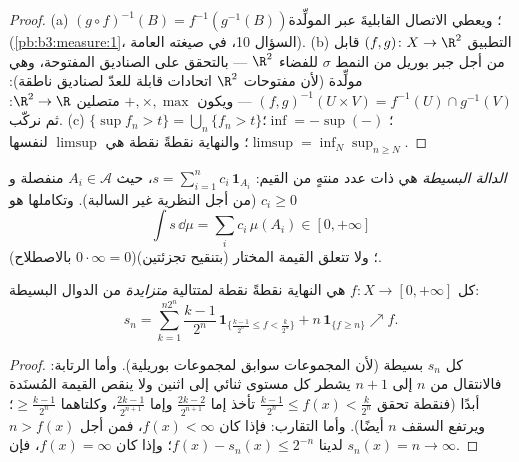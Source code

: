 \begin{proof}
(a) $(g\circ f)^{-1}(B) = f^{-1}(g^{-1}(B))$؛ ويعطي الاتصال القابليةَ  عبر  المولِّدة (\cref{pb:b3:measure:1}، السؤال 10، في صيغته العامة).
(b) التطبيق $(f, g) \colon X \to \R^2$ قابل  من أجل جبر بوريل من النمط
$\sigma$ للفضاء $\R^2$ --- بالتحقق على الصناديق المفتوحة، وهي
مولِّدة (لأن مفتوحات $\R^2$ اتحادات قابلة للعدّ لصناديق ناطقة):
$(f,g)^{-1}(U\times V) = f^{-1}(U)\cap g^{-1}(V)$ --- ويكون $+, \times, \max$ متصلين $\R^2 \to \R$: ثم نركّب.
(c) $\{\sup f_n > t\} = \bigcup_n\{f_n > t\}$؛ $\inf = -\sup(-)$؛ $\limsup = \inf_N\sup_{n \geq N}$؛ والنهاية نقطةً نقطة هي $\limsup$
لنفسها.
\end{proof}

\begin{definition}\label{def:b3:lebesgue:simple}
\emph{الدالة البسيطة} هي  ذات
عدد منتهٍ من القيم: $s = \sum_{i=1}^n
c_i\,\mathbf 1_{A_i}$، حيث $A_i \in \mathcal A$ منفصلة و $c_i \geq
0$ (من أجل
النظرية غير السالبة). وتكاملها هو
\[
\int s\,\dd\mu = \sum_i c_i\,\mu(A_i) \in [0, +\infty]
\]
(بالاصطلاح $0\cdot\infty = 0$)؛ ولا تتعلق القيمة  المختار (بتنقيح
تجزئتين).
\end{definition}

\begin{theorem}
\label{thm:b3:lebesgue:approximation}
كل  $f \colon X \to [0, +\infty]$ هي النهاية نقطةً نقطة لمتتالية
\emph{متزايدة} من الدوال البسيطة:
\[
s_n = \sum_{k=1}^{n2^n} \frac{k-1}{2^n}\,
\mathbf 1_{\{\frac{k-1}{2^n} \leq f < \frac k{2^n}\}}
+ n\,\mathbf 1_{\{f \geq n\}} \nearrow f .
\]
\end{theorem}

\begin{proof}
كل $s_n$ بسيطة (لأن المجموعات سوابق لمجموعات بوريلية). وأما
الرتابة: فالانتقال من $n$ إلى $n+1$ يشطر كل مستوى ثنائي إلى
اثنين ولا ينقص القيمة المُسنَدة أبدًا (فنقطة تحقق $\frac{k-1}{2^n} \leq f(x) < \frac k{2^n}$ تأخذ
إما $\frac{2k-2}{2^{n+1}}$ وإما $\frac{2k-1}{2^{n+1}}$، وكلتاهما $\geq
\frac{k-1}{2^n}$؛ ويرتفع السقف $n$
أيضًا). وأما التقارب: فإذا كان $f(x) < \infty$، فمن أجل
$n > f(x)$ لدينا $f(x) - s_n(x) \leq
2^{-n}$؛ وإذا كان $f(x) = \infty$، فإن $s_n(x) = n \to \infty$.
\end{proof}

